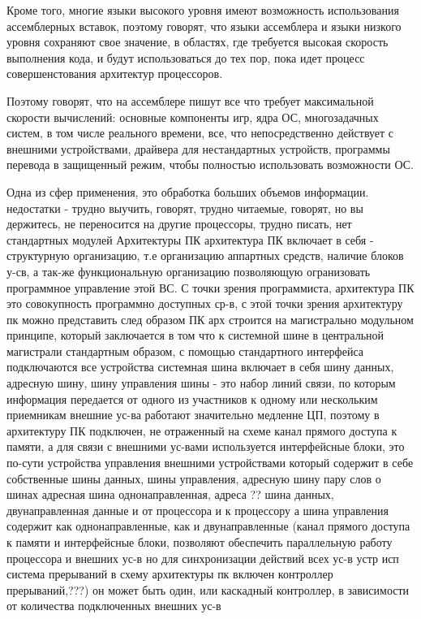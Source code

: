 Кроме того, многие языки высокого уровня имеют возможность использования ассемблерных 
вставок, поэтому говорят, что языки ассемблера и языки низкого уровня сохраняют свое значение, в областях, 
где требуется высокая скорость выполнения кода,
и будут использоваться до тех пор, пока идет процесс совершенстования архитектур процессоров.

Поэтому говорят, что на ассемблере пишут все что требует максимальной скорости вычислений: основные компоненты игр, ядра ОС, многозадачных систем, в том числе реального времени,
все, что непосредственно действует с внешними устройствами, драйвера для нестандартных устройств, 
программы перевода в защищенный режим, чтобы полностью использовать возможности ОС.

Одна из сфер применения, это обработка больших объемов информации.
недостатки - трудно выучить, говорят, трудно читаемые, говорят, но вы держитесь, не переносится на другие процессоры, трудно писать, нет стандартных модулей
Архитектуры ПК
архитектура ПК включает в себя - структурную организацию, т.е организацию аппартных средств, наличие блоков у-св, а так-же функциональную организацию
позволяющую огранизовать программное управление этой ВС. С точки зрения программиста, архитектура ПК это совокупность программно доступных ср-в, 
с этой точки зрения архитектуру пк можно представить след образом
ПК арх строится на магистрально модульном принципе, который заключается в том что к системной шине в центральной магистрали стандартным образом, с помощью стандартного интерфейса 
подключаются все устройства
системная шина включает в себя шину данных, адресную шину, шину управления
шины - это набор линий связи, по которым информация передается от одного из участников к одному или нескольким приемникам
внешние ус-ва работают значительно медленне ЦП, поэтому в архитектуру ПК подключен, не отраженный на схеме канал прямого доступа к памяти, 
а для связи с внешними ус-вами используется интерфейсные блоки, это по-сути устройства управления внешними устройствами
который содержит в себе собственные шины данных, шины управления, адресную шину
пару слов о шинах
адресная шина однонаправленная, адреса ?? 
шина данных, двунаправленная данные и от процессора и к процессору
а шина управления содержит как однонаправленные, как и двунаправленные
(канал прямого доступа к памяти и интерфейсные блоки, позволяют обеспечить параллельную работу процессора и внешних ус-в
но для синхронизации действий всех ус-в устр исп система прерываний в схему архитектуры пк включен контроллер прерываний,???)
он может быть один, или каскадный контроллер, в зависимости от количества подключенных внешних ус-в
